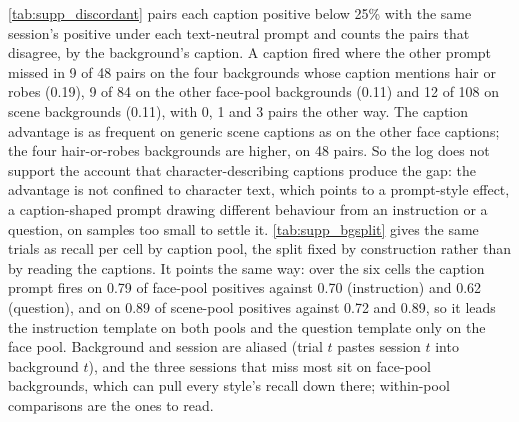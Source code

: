 \cref{tab:supp_discordant} pairs each caption positive below 25\% with the same session's
positive under each text-neutral prompt and counts the pairs that disagree, by the background's
caption. A caption fired where the other prompt missed in 9 of 48 pairs on the four backgrounds
whose caption mentions hair or robes (0.19), 9 of 84 on the other face-pool backgrounds (0.11)
and 12 of 108 on scene backgrounds (0.11), with 0, 1 and 3 pairs the other way. The caption
advantage is as frequent on generic scene captions as on the other face captions; the four
hair-or-robes backgrounds are higher, on 48 pairs. So the log does not support the account that
character-describing captions produce the gap: the advantage is not confined to character text,
which points to a prompt-style effect, a caption-shaped prompt drawing different behaviour from
an instruction or a question, on samples too small to settle it. \cref{tab:supp_bgsplit} gives
the same trials as recall per cell by caption pool, the split fixed by construction rather than
by reading the captions. It points the same way: over the six cells the caption prompt fires on
0.79 of face-pool positives against 0.70 (instruction) and 0.62 (question), and on 0.89 of
scene-pool positives against 0.72 and 0.89, so it leads the instruction template on both pools
and the question template only on the face pool. Background and session are aliased (trial $t$
pastes session $t$ into background $t$), and the three sessions that miss most sit on
face-pool backgrounds, which can pull every style's recall down there; within-pool comparisons
are the ones to read.
\SuppDiscordantTable
\SuppBackgroundSplitTable

